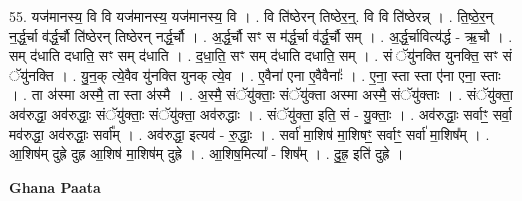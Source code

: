 \documentclass[17pt]{extarticle}
\begin{document}
55. यज॑मानस्य॒ वि वि यज॑मानस्य॒ यज॑मानस्य॒ वि । . वि ति॑ष्ठेरन् तिष्ठेर॒न्॒. वि वि ति॑ष्ठेरन्न् । . ति॒ष्ठे॒र॒न् न॒र्द्ध॒र्चा व॑र्द्ध॒र्चौ ति॑ष्ठेरन् तिष्ठेरन् नर्द्ध॒र्चौ । . अ॒र्द्ध॒र्चौ सꣳ स म॑र्द्ध॒र्चा व॑र्द्ध॒र्चौ सम् । . अ॒र्द्ध॒र्चावित्य॑र्द्ध - ऋ॒चौ । . सम् द॑धाति दधाति॒ सꣳ सम् द॑धाति । . द॒धा॒ति॒ सꣳ सम् द॑धाति दधाति॒ सम् । . सं ॅयु॑नक्ति युनक्ति॒ सꣳ सं ॅयु॑नक्ति । . यु॒न॒क् त्ये॒वैव यु॑नक्ति युनक् त्ये॒व । . ए॒वैना॑ एना ए॒वैवैनाः᳚ । . ए॒ना॒ स्ता स्ता ए॑ना एना॒ स्ताः । . ता अ॑स्मा अस्मै॒ ता स्ता अ॑स्मै । . अ॒स्मै॒ संॅयु॑क्ताः॒ संॅयु॑क्ता अस्मा अस्मै॒ संॅयु॑क्ताः । . संॅयु॑क्ता॒ अव॑रुद्धा॒ अव॑रुद्धाः॒ संॅयु॑क्ताः॒ संॅयु॑क्ता॒ अव॑रुद्धाः । . संॅयु॑क्ता॒ इति॒ सं - यु॒क्ताः॒ । . अव॑रुद्धाः॒ सर्वाꣳ॒॒ सर्वा॒ मव॑रुद्धा॒ अव॑रुद्धाः॒ सर्वा᳚म् । . अव॑रुद्धा॒ इत्यव॑ - रु॒द्धाः॒ । . सर्वा॑ मा॒शिष॑ मा॒शिषꣳ॒॒ सर्वाꣳ॒॒ सर्वा॑ मा॒शिष᳚म् । . आ॒शिष॑म् दुह्रे दुह्र आ॒शिष॑ मा॒शिष॑म् दुह्रे । . आ॒शिष॒मित्या᳚ - शिष᳚म् । . दु॒ह्र॒ इति॑ दुह्रे । \newline

\textbf{Ghana Paata } \newline
\end{document}
